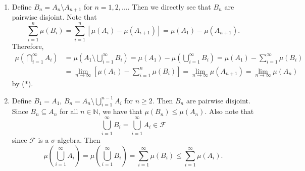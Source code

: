 \documentclass[12pt]{report}
\newcommand{\numl}[1]{\item[\large\textbf{\sffamily #1.}]}
\newcommand{\mc}[1]{\mathcal{#1}}
\newcommand{\bs}{\setminus}
\renewcommand{\subset}{\subseteq}
\newcommand{\paren}[1]{\left( #1 \right)}
\newcommand{\ra}{\rightarrow}
\newcommand{\mast}{\(\ast\)}
\newcommand{\N}{\mathbb{N}}
\begin{document}
\begin{enumerate}
    \numl{5} Define \(B_n = A_n \bs A_{n+1}\) for \(n = 1, 2, \dots\). Then we directly see that \(B_n\) are pairwise disjoint. Note that
    \[ \tag{\mast}
        \sum_{i=1}^n \mu(B_i) = \sum_{i=1}^n \left[\mu(A_i) - \mu(A_{i+1})\right] = \mu(A_1) - \mu(A_{n+1}).
    \]
    Therefore,
    \[
        \begin{aligned}
            \mu\paren{\bigcap_{i=1}^\infty A_i} & = \mu\paren{A_1 \bs \bigcup_{i=1}^\infty B_i} = \mu(A_1) - \mu\paren{\bigcup_{i=1}^\infty B_i} = \mu(A_1) - \sum_{i=1}^\infty \mu(B_i) \\
                                                & =\lim_{n\ra\infty} \left[\mu(A_1) - \sum_{i=1}^n \mu(B_i)\right] = \lim_{n\ra \infty} \mu(A_{n+1}) = \lim_{n\ra \infty} \mu(A_{n})
        \end{aligned}
    \]
    by (\mast).

    \numl{6} Define \(B_1 = A_1\), \(B_n = A_n \bs \bigcup_{i=1}^{n-1} A_i\) for \(n \geq 2\). Then \(B_n\) are pairwise disjoint. Since \(B_n \subset A_n\) for all \(n \in \N\), we have that \(\mu(B_n) \leq \mu(A_n)\). Also note that
    \[
        \bigcup_{i=1}^\infty B_i = \bigcup_{i=1}^\infty A_i \in \mc{F}
    \]
    since \(\mc{F}\) is a \(\sigma\)-algebra. Then
    \[
        \mu\paren{\bigcup_{i=1}^\infty A_i} = \mu\paren{\bigcup_{i=1}^\infty B_i} = \sum_{i=1}^\infty \mu(B_i) \leq \sum_{i=1}^\infty \mu(A_i).
    \]
\end{enumerate}
\end{document}
